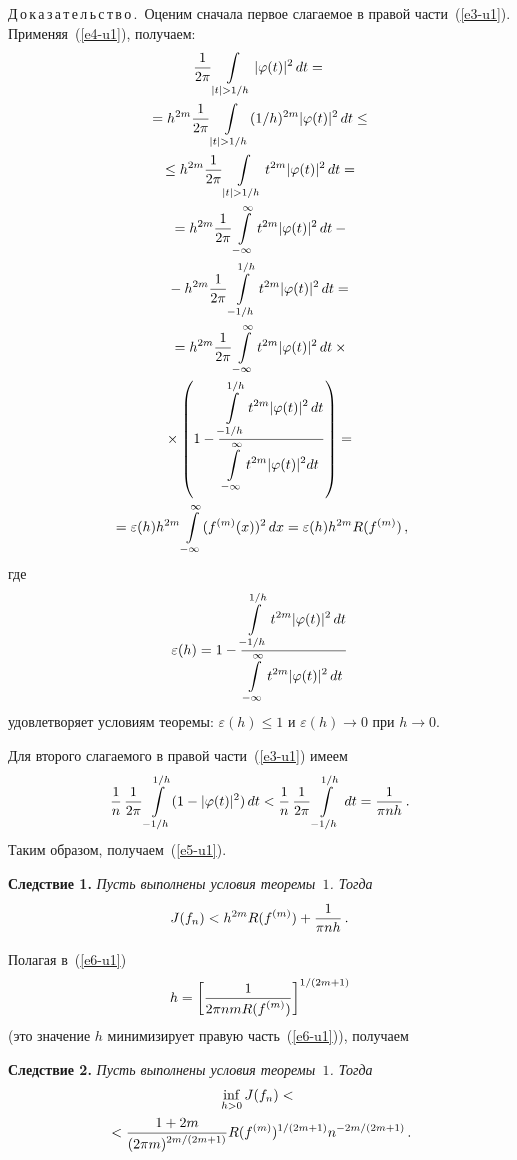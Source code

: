 \begin{multicols}{2}
\noindent
Д\,о\,к\,а\,з\,а\,т\,е\,л\,ь\,с\,т\,в\,о\,.\ 
Оценим сначала первое слагаемое в правой части~(\ref{e3-u1}).
Применяя~(\ref{e4-u1}), получаем:
\begin{multline*}
\fr{1}{2\pi}\int\limits_{|t|>1/h}|\varphi(t)|^2\,dt={}\\
{}=
h^{2m}\fr{1}{2\pi}\int\limits_{|t|>1/h}(1/h)^{2m}|\varphi(t)|^2\,dt\le{}\\
{}\le h^{2m}\fr{1}{2\pi}\int\limits_{|t|>1/h}t^{2m}|\varphi(t)|^2\,dt={}\\
{}=
h^{2m}\fr{1}{2\pi}\int\limits_{-\infty}^\infty t^{2m}|\varphi(t)|^2\,dt-{}\\
{}-
h^{2m}\fr{1}{2\pi}\int\limits_{-1/h}^{1/h} t^{2m}|\varphi(t)|^2\,dt
={}\\
{}=
h^{2m}\fr{1}{2\pi}\int\limits_{-\infty}^\infty t^{2m}|\varphi(t)|^2\,dt\times{}\\
{}\times
\left(1-\fr{\int\limits_{-1/h}^{1/h}
t^{2m}|\varphi(t)|^2\,dt}{\int\limits_{-\infty}^\infty t^{2m}|\varphi(t)|^2dt}
\right)={}\\
{}=\varepsilon(h)h^{2m}\int\limits_{-\infty}^\infty(f^{(m)}(x))^2\,dx=
\varepsilon(h)h^{2m}R(f^{(m)})\,,
\end{multline*}
где
$$
\varepsilon(h)= 1-\displaystyle\frac{\displaystyle \int\limits_{-1/h}^{1/h}
t^{2m}|\varphi(t)|^2\,dt\mathstrut}{\displaystyle \int\limits_{-\infty}^\infty t^{2m}|\varphi(t)|^2\,dt\mathstrut}
$$
удовлетворяет условиям теоремы:
$\varepsilon(h)\le1$ и $\varepsilon(h)\to0$ при $h\to0$.

Для второго слагаемого в правой части~(\ref{e3-u1}) имеем
$$
\displaystyle\frac{\displaystyle 1\mathstrut}{\displaystyle n\mathstrut}\,\displaystyle\frac{\displaystyle 1\mathstrut}{\displaystyle 2\pi\mathstrut}\int\limits_{-1/h}^{1/h}(1-|\varphi(t)|^2)\,dt<
\displaystyle\frac{\displaystyle 1\mathstrut}{\displaystyle n\mathstrut}\,\displaystyle\frac{\displaystyle 1\mathstrut}{\displaystyle 2\pi\mathstrut}\int\limits_{-1/h}^{1/h}\,dt=\displaystyle\frac{\displaystyle 1\mathstrut}{\displaystyle \pi nh\mathstrut}\,.
$$
Таким образом, получаем~(\ref{e5-u1}).

\medskip

\noindent
\textbf{Следствие 1.} \textit{Пусть выполнены условия теоремы~$1$. Тогда}
\begin{equation}
J(f_n)<h^{2m}R(f^{(m)})+\displaystyle\frac{\displaystyle 1\mathstrut}{\displaystyle \pi nh\mathstrut}\,.
\label{e6-u1}
\end{equation}

Полагая в~(\ref{e6-u1})
$$
h=\left[\displaystyle\frac{\displaystyle 1\mathstrut}{\displaystyle 2\pi nmR(f^{(m)})\mathstrut}\right]^{1/(2m+1)}
$$
(это значение $h$ минимизирует правую часть~(\ref{e6-u1})), получаем

\smallskip

\noindent
\textbf{Следствие 2.} \textit{Пусть выполнены условия теоремы~$1$. Тогда}
\begin{multline*}
\inf\limits_{h>0}J(f_n)<{}\\
{}< \displaystyle\frac{\displaystyle 1+2m\mathstrut}{\displaystyle (2\pi m)^{2m/(2m+1)}\mathstrut}
R(f^{(m)})^{1/(2m+1)}n^{-2m/(2m+1)}\,.
\end{multline*}


\end{multicols}
